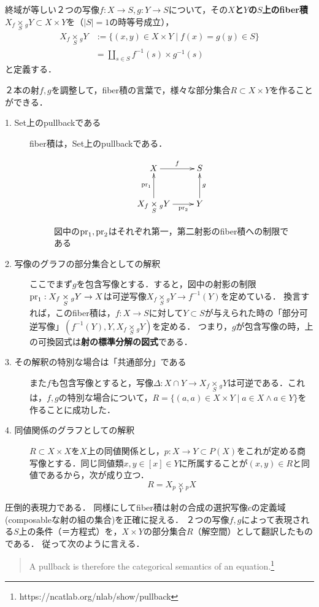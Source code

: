 \documentclass[uplatex,dvipdfmx]{jsreport}
\begin{document}
\begin{definition}[fiber積]
    終域が等しい２つの写像$f:X\rightarrow S, g:Y\rightarrow S$について，その\textbf{$X$と$Y$の$S$上のfiber積}$X_f\underset{S}{\times}{}_gY\subset X\times Y$を（$|S|=1$の時等号成立），
    \begin{align*}
        X_f\underset{S}{\times}{}_gY&:=\{ (x,y)\in X\times Y\mid f(x)=g(y)\in S \}\\
        &=\coprod_{s\in S}f^{-1}(s)\times g^{-1}(s)
    \end{align*}
    と定義する．
\end{definition}
\begin{example}[fiber積の立ち位置を他の概念との連関の中で把握する]
    ２本の射$f,g$を調整して，fiber積の言葉で，様々な部分集合$R\subset X\times Y$を作ることができる．
    \begin{description}
        \item[1. Set上のpullbackである] fiber積は，Set上のpullbackである．
        \begin{figure}[h]
            \[\xymatrix{
            X\ar[r]^-f&S\\
            {X_f\underset{S}{\times}{}_{g}Y}\ar[u]^-{\pr_1}\ar[r]_-{\pr_2}&Y\ar[u]_-g
        }\]
        \caption{図中の$\mathrm{pr}_1,\mathrm{pr}_2$はそれぞれ第一，第二射影のfiber積への制限である}
        \end{figure}
        \item[2. 写像のグラフの部分集合としての解釈]
        ここでまず$g$を包含写像とする．すると，図中の射影の制限$\mathrm{pr}_1:X_f\underset{S}{\times}{}_{g}Y\to X$は可逆写像$X_f\underset{S}{\times}{}_{g}Y\to f^{-1}(Y)$を定めている．
        換言すれば，このfiber積は，$f:X\to S$に対して$Y\subset S$が与えられた時の「部分可逆写像」$(f^{-1}(Y),Y,X_f\underset{S}{\times}{}_{g}Y)$を定める．
        つまり，$g$が包含写像の時，上の可換図式は\textbf{射の標準分解の図式}である．
        \item[3. その解釈の特別な場合は「共通部分」である]
        また$f$も包含写像とすると，写像$\Delta:X\cap Y\to X_f\underset{S}{\times}{}_{g}Y$は可逆である．これは，$f,g$の特別な場合について，$R=\{(a,a)\in X\times Y\mid a\in X\land a\in Y \}$を作ることに成功した．
        \item[4. 同値関係のグラフとしての解釈]
        $R\subset X\times X$を$X$上の同値関係とし，$p:X\to Y\subset P(X)$をこれが定める商写像とする．同じ同値類$x,y\in [x]\in Y$に所属することが$(x,y)\in R$と同値であるから，次が成り立つ．
        \[ R=X_p\underset{Y}{\times}{}_{p}X \]
    \end{description}
\end{example}
\begin{remarks}
    圧倒的表現力である．
    同様にしてfiber積は射の合成の選択写像$c$の定義域(composableな射の組の集合)を正確に捉える．
    ２つの写像$f,g$によって表現される$S$上の条件（＝方程式）を，$X\times Y$の部分集合$R$（解空間）として翻訳したものである．
    従って次のように言える．
    \begin{quote}
        A pullback is therefore the categorical semantics of an equation.\footnote{https://ncatlab.org/nlab/show/pullback}
    \end{quote}
\end{remarks}
\end{document}
